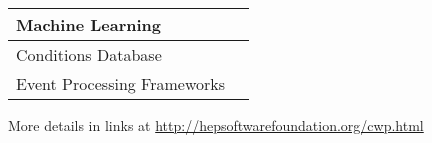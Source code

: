 \begin{frame}
\begin{table}[h!]
\begin{tabular}{|l|l|}
Machine Learning & \\ \hline

Conditions Database & \\ \hline

Event Processing Frameworks & \\ \hline
\end{tabular}
\end{table}

\begin{center}
\small{More details in links at \color{blue} {\url{http://hepsoftwarefoundation.org/cwp.html}}}
\end{center}

\end{frame}


